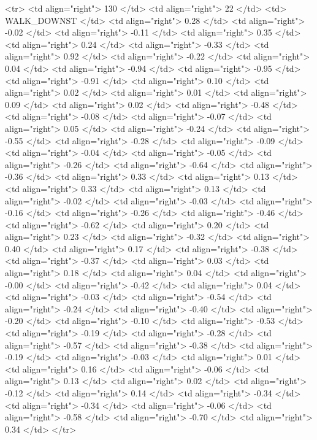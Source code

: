   <tr> <td align="right"> 130 </td> <td align="right">  22 </td> <td> WALK_DOWNST </td> <td align="right"> 0.28 </td> <td align="right"> -0.02 </td> <td align="right"> -0.11 </td> <td align="right"> 0.35 </td> <td align="right"> 0.24 </td> <td align="right"> -0.33 </td> <td align="right"> 0.92 </td> <td align="right"> -0.22 </td> <td align="right"> 0.04 </td> <td align="right"> -0.94 </td> <td align="right"> -0.95 </td> <td align="right"> -0.91 </td> <td align="right"> 0.10 </td> <td align="right"> 0.02 </td> <td align="right"> 0.01 </td> <td align="right"> 0.09 </td> <td align="right"> 0.02 </td> <td align="right"> -0.48 </td> <td align="right"> -0.08 </td> <td align="right"> -0.07 </td> <td align="right"> 0.05 </td> <td align="right"> -0.24 </td> <td align="right"> -0.55 </td> <td align="right"> -0.28 </td> <td align="right"> -0.09 </td> <td align="right"> -0.04 </td> <td align="right"> -0.05 </td> <td align="right"> -0.26 </td> <td align="right"> -0.64 </td> <td align="right"> -0.36 </td> <td align="right"> 0.33 </td> <td align="right"> 0.13 </td> <td align="right"> 0.33 </td> <td align="right"> 0.13 </td> <td align="right"> -0.02 </td> <td align="right"> -0.03 </td> <td align="right"> -0.16 </td> <td align="right"> -0.26 </td> <td align="right"> -0.46 </td> <td align="right"> -0.62 </td> <td align="right"> 0.20 </td> <td align="right"> 0.23 </td> <td align="right"> -0.32 </td> <td align="right"> 0.40 </td> <td align="right"> 0.17 </td> <td align="right"> -0.38 </td> <td align="right"> -0.37 </td> <td align="right"> 0.03 </td> <td align="right"> 0.18 </td> <td align="right"> 0.04 </td> <td align="right"> -0.00 </td> <td align="right"> -0.42 </td> <td align="right"> 0.04 </td> <td align="right"> -0.03 </td> <td align="right"> -0.54 </td> <td align="right"> -0.24 </td> <td align="right"> -0.40 </td> <td align="right"> -0.20 </td> <td align="right"> -0.10 </td> <td align="right"> -0.53 </td> <td align="right"> -0.19 </td> <td align="right"> -0.28 </td> <td align="right"> -0.57 </td> <td align="right"> -0.38 </td> <td align="right"> -0.19 </td> <td align="right"> -0.03 </td> <td align="right"> 0.01 </td> <td align="right"> 0.16 </td> <td align="right"> -0.06 </td> <td align="right"> 0.13 </td> <td align="right"> 0.02 </td> <td align="right"> -0.12 </td> <td align="right"> 0.14 </td> <td align="right"> -0.34 </td> <td align="right"> -0.34 </td> <td align="right"> -0.06 </td> <td align="right"> -0.58 </td> <td align="right"> -0.70 </td> <td align="right"> 0.34 </td> </tr>
